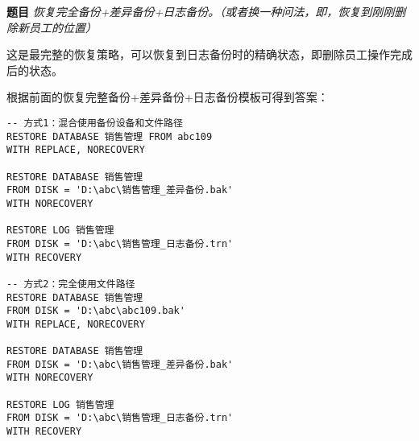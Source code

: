 \textbf{题目} \emph{恢复完全备份+差异备份+日志备份。（或者换一种问法，即，恢复到刚刚删除新员工的位置）}

\qquad 这是最完整的恢复策略，可以恢复到日志备份时的精确状态，即删除员工操作完成后的状态。

\qquad 根据前面的恢复完整备份+差异备份+日志备份模板可得到答案：

\begin{mdframed}[backgroundcolor=blue!5]
\begin{verbatim}
-- 方式1：混合使用备份设备和文件路径
RESTORE DATABASE 销售管理 FROM abc109
WITH REPLACE, NORECOVERY

RESTORE DATABASE 销售管理
FROM DISK = 'D:\abc\销售管理_差异备份.bak'
WITH NORECOVERY

RESTORE LOG 销售管理
FROM DISK = 'D:\abc\销售管理_日志备份.trn'
WITH RECOVERY

-- 方式2：完全使用文件路径
RESTORE DATABASE 销售管理
FROM DISK = 'D:\abc\abc109.bak'
WITH REPLACE, NORECOVERY

RESTORE DATABASE 销售管理
FROM DISK = 'D:\abc\销售管理_差异备份.bak'
WITH NORECOVERY

RESTORE LOG 销售管理
FROM DISK = 'D:\abc\销售管理_日志备份.trn'
WITH RECOVERY
\end{verbatim}
\end{mdframed}
